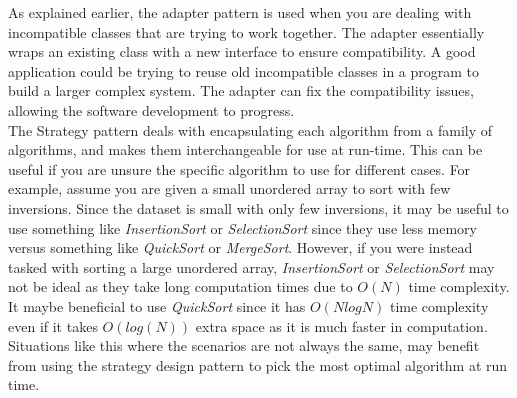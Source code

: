 \documentclass[12pt]{article}
\begin{document}
As explained earlier, the adapter pattern is used when you are dealing with incompatible classes that are trying to work together. The adapter essentially wraps an existing class with a new interface to ensure compatibility. A good application could be trying to reuse old incompatible classes in a program to build a larger complex system. The adapter can fix the compatibility issues, allowing the software development to progress.\\

The Strategy pattern deals with encapsulating each algorithm from a family of algorithms, and makes them interchangeable for use at run-time. This can be useful if you are unsure the specific algorithm to use for different cases. For example, assume you are given a small unordered array to sort with few inversions. Since the dataset is small with only few inversions, it may be useful to use something like \emph{InsertionSort} or \emph{SelectionSort} since they use less memory versus something like \emph{QuickSort} or \emph{MergeSort}. However, if you were instead tasked with sorting a large unordered array, \emph{InsertionSort} or \emph{SelectionSort} may not be ideal as they take long computation times due to $O(N)$ time complexity. It maybe beneficial to use \emph{QuickSort} since it has $O(N log N)$ time complexity even if it takes $O(log(N))$ extra space as it is much faster in computation. Situations like this where the scenarios are not always the same, may benefit from using the strategy design pattern to pick the most optimal algorithm at run time.\\
\end{document}
